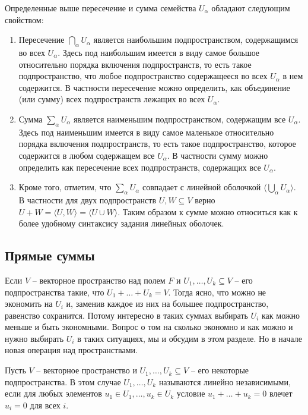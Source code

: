 Определенные выше пересечение и сумма семейства $U_\alpha$ обладают следующим свойством:
\begin{enumerate}
\item Пересечение $\bigcap_{\alpha} U_\alpha$ является наибольшим подпространством, содержащимся во всех $U_\alpha$.
Здесь под наибольшим имеется в виду самое большое относительно порядка включения подпространств, то есть такое подпространство, что любое подпространство содержащееся во всех $U_\alpha$ в нем содержится.
В частности пересечение можно определить, как объединение (или сумму) всех подпространств лежащих во всех $U_\alpha$.

\item Сумма $\sum_\alpha U_\alpha$ является наименьшим подпространством, содержащим все $U_\alpha$.
Здесь под наименьшим имеется в виду самое маленькое относительно порядка включения подпространств, то есть такое подпространство, которое содержится в любом содержащем все $U_\alpha$.
В частности сумму можно определить как пересечение всех подпространств, содержащих все $U_\alpha$.

\item Кроме того, отметим, что $\sum_{\alpha} U_\alpha$ совпадает с линейной оболочкой $\langle \bigcup_\alpha U_\alpha \rangle$.
В частности для двух подпространств $U,W\subseteq V$ верно $U + W = \langle U, W\rangle = \langle U\cup W\rangle$.
Таким образом к сумме можно относиться как к более удобному синтаксису задания линейных оболочек.
\end{enumerate}




\subsection{Прямые суммы}

Если $V$ -- векторное пространство над полем $F$ и $U_1,\ldots,U_k\subseteq V$ -- его подпространства такие, что $U_1 + \ldots + U_k = V$.
Тогда ясно, что можно не экономить на $U_i$ и, заменив каждое из них на большее подпространство, равенство сохранится.
Потому интересно в таких суммах выбирать $U_i$ как можно меньше и быть экономными.
Вопрос о том на сколько экономно и как можно и нужно выбирать $U_i$ в таких ситуациях, мы и обсудим в этом разделе.
Но в начале новая операция над пространствами.

\begin{definition}
\label{def::IndepSpaces}
Пусть $V$ -- векторное пространство и $U_1,\ldots,U_k\subseteq V$ -- его некоторые подпространства.
В этом случае $U_1,\ldots, U_k$ называются линейно независимыми, если для любых элементов $u_1\in U_1, \ldots, u_k\in U_k$ условие $u_1 + \ldots + u_k = 0$ влечет $u_i = 0$ для всех $i$.
\end{definition}

